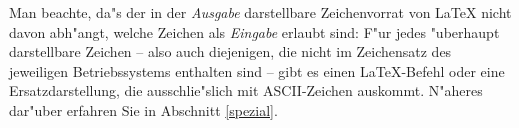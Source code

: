 Man beachte, da"s der in der \emph{Ausgabe} darstellbare Zeichenvorrat 
von \LaTeX{} nicht davon abh"angt, welche Zeichen als \emph{Eingabe} erlaubt 
sind:
F"ur jedes "uberhaupt darstellbare Zeichen -- also auch diejenigen, die
nicht im Zeichensatz des jeweiligen Betriebssystems enthalten sind --
gibt es einen 
\LaTeX-Befehl oder eine Ersatzdarstellung, die ausschlie"slich mit 
ASCII-Zeichen auskommt.  N"aheres dar"uber erfahren Sie
in Abschnitt \ref{spezial}.



\endinput
